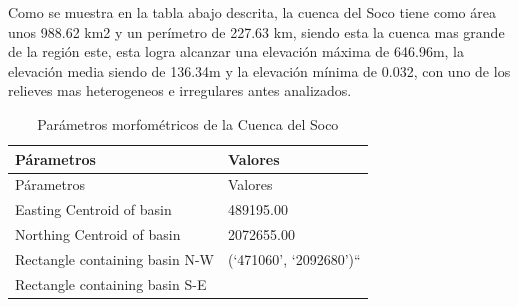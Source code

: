 \documentclass[11pt,]{article}
\begin{document}
Como se muestra en la tabla abajo descrita, la cuenca del Soco tiene
como área unos 988.62 km2 y un perímetro de 227.63 km, siendo esta la
cuenca mas grande de la región este, esta logra alcanzar una elevación
máxima de 646.96m, la elevación media siendo de 136.34m y la elevación
mínima de 0.032, con uno de los relieves mas heterogeneos e irregulares
antes analizados.

\begin{longtable}[]{@{}ll@{}}
\caption{\label{tablasiete}Parámetros morfométricos de la Cuenca del
Soco}\tabularnewline
\toprule
\begin{minipage}[b]{0.66\columnwidth}\raggedright\strut
Párametros\strut
\end{minipage} & \begin{minipage}[b]{0.28\columnwidth}\raggedright\strut
Valores\strut
\end{minipage}\tabularnewline
\midrule
\endfirsthead
\toprule
\begin{minipage}[b]{0.66\columnwidth}\raggedright\strut
Párametros\strut
\end{minipage} & \begin{minipage}[b]{0.28\columnwidth}\raggedright\strut
Valores\strut
\end{minipage}\tabularnewline
\midrule
\endhead
\begin{minipage}[t]{0.66\columnwidth}\raggedright\strut
Easting Centroid of basin\strut
\end{minipage} & \begin{minipage}[t]{0.28\columnwidth}\raggedright\strut
489195.00\strut
\end{minipage}\tabularnewline
\begin{minipage}[t]{0.66\columnwidth}\raggedright\strut
Northing Centroid of basin\strut
\end{minipage} & \begin{minipage}[t]{0.28\columnwidth}\raggedright\strut
2072655.00\strut
\end{minipage}\tabularnewline
\begin{minipage}[t]{0.66\columnwidth}\raggedright\strut
Rectangle containing basin N-W\strut
\end{minipage} & \begin{minipage}[t]{0.28\columnwidth}\raggedright\strut
(`471060', `2092680')``\strut
\end{minipage}\tabularnewline
\begin{minipage}[t]{0.66\columnwidth}\raggedright\strut
Rectangle containing basin S-E\strut
\end{minipage} & \begin{minipage}[t]{0.28\columnwidth}\raggedright\strut

\end{minipage}
\end{longtable}
\end{document}
